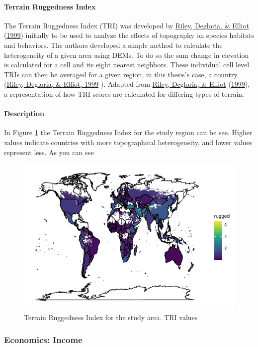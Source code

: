 \documentclass[12pt,twoside]{reedthesis}
\begin{document}
\hypertarget{TRI}{%
\paragraph{Terrain Ruggedness Index}\label{TRI}}

The Terrain Ruggedness Index (TRI) was developed by \protect\hyperlink{ref-rileyTerrainRuggednessIndex1999}{Riley, Degloria, \& Elliot} (\protect\hyperlink{ref-rileyTerrainRuggednessIndex1999}{1999}) initially to be used to analyze the effects of topography on species habitats and behaviors. The authors developed a simple method to calculate the heterogeneity of a given area using DEMs. To do so the sum change in elevation is calculated for a cell and its eight nearest neighbors. These individual cell level TRIs can then be averaged for a given region, in this thesis's case, a country (\protect\hyperlink{ref-rileyTerrainRuggednessIndex1999}{Riley, Degloria, \& Elliot, 1999} ). Adapted from \protect\hyperlink{ref-rileyTerrainRuggednessIndex1999}{Riley, Degloria, \& Elliot} (\protect\hyperlink{ref-rileyTerrainRuggednessIndex1999}{1999}), a representation of how TRI scores are calculated for differing types of terrain.

\hypertarget{ruggeddesc}{%
\paragraph{Description}\label{ruggeddesc}}

In Figure \ref{fig:TRI} the Terrain Ruggedness Index for the study region can be see. Higher values indicate countries with more topographical heterogeneity, and lower values represent less. As you can see
\begin{figure}
\centering
\includegraphics{thesis_files/figure-latex/TRI-1.pdf}
\caption{\label{fig:TRI}Terrain Ruggedness Index for the study area. TRI values}
\end{figure}
\hypertarget{gdppc}{%
\subsubsection{Economics: Income}\label{gdppc}}
\end{document}
